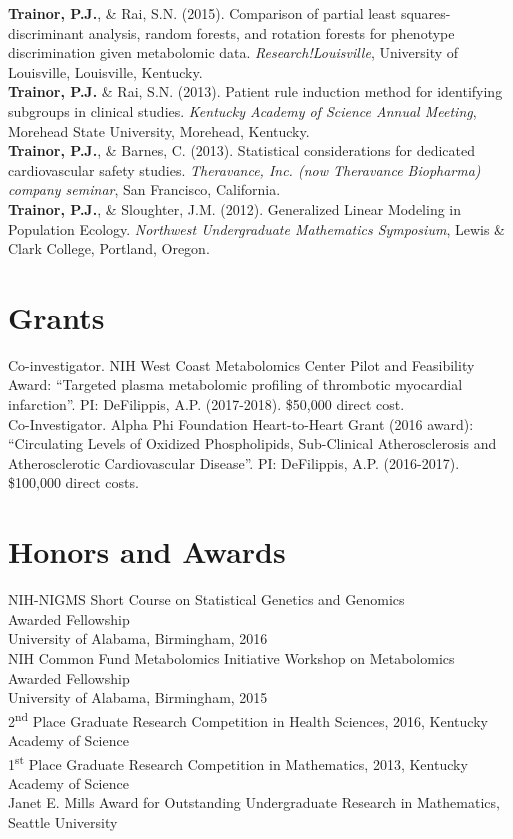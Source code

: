 \textbf{Trainor, P.J.}, \& Rai, S.N. (2015). Comparison of partial least squares-discriminant analysis, random forests, and rotation forests for phenotype discrimination given metabolomic data. \emph{Research!Louisville}, University of Louisville, Louisville, Kentucky. \\

\textbf{Trainor, P.J.} \& Rai, S.N. (2013). Patient rule induction method for identifying subgroups in clinical studies. \emph{Kentucky Academy of Science Annual Meeting}, Morehead State University, Morehead, Kentucky. \\

\textbf{Trainor, P.J.}, \& Barnes, C. (2013). Statistical considerations for dedicated cardiovascular safety studies. \emph{Theravance, Inc. (now Theravance Biopharma) company seminar}, San Francisco, California. \\

\textbf{Trainor, P.J.}, \& Sloughter, J.M. (2012). Generalized Linear Modeling in Population Ecology. \emph{Northwest Undergraduate Mathematics Symposium}, Lewis \& Clark College, Portland, Oregon. \\

\section*{Grants}
Co-investigator. NIH West Coast Metabolomics Center Pilot and Feasibility Award: ``Targeted plasma metabolomic profiling of thrombotic myocardial infarction''. PI: DeFilippis, A.P. (2017-2018). \$50,000 direct cost.  \\

Co-Investigator. Alpha Phi Foundation Heart-to-Heart Grant (2016 award): ``Circulating Levels of Oxidized Phospholipids, Sub-Clinical Atherosclerosis and Atherosclerotic Cardiovascular Disease''. PI: DeFilippis, A.P. (2016-2017). \$100,000 direct costs. \\

\section*{Honors and Awards} 
NIH-NIGMS Short Course on Statistical Genetics and Genomics \\
Awarded Fellowship\\
University of Alabama, Birmingham, 2016 \\

NIH Common Fund Metabolomics Initiative Workshop on Metabolomics\\
Awarded Fellowship\\
University of Alabama, Birmingham, 2015 \\

2\textsuperscript{nd} Place Graduate Research Competition in Health Sciences, 2016, Kentucky Academy of Science \\

1\textsuperscript{st} Place Graduate Research Competition in Mathematics, 2013, Kentucky Academy of Science \\

Janet E. Mills Award for Outstanding Undergraduate Research in Mathematics, Seattle University

